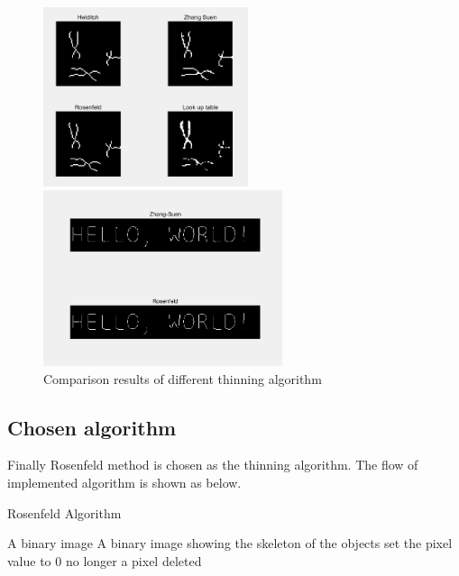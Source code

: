 \documentclass[hyperref]{article}
\theoremstyle{nonumberplain}
\begin{document}
	\begin{figure}[h]
		\centering
		\begin{minipage}[t]{0.48\textwidth}
			\centering
			\includegraphics[width=6cm]{result.png}
		\end{minipage}
		\begin{minipage}[t]{0.48\textwidth}
			\centering
			\includegraphics[width=7cm]{thinning result Q2.png}
		\end{minipage}
		\caption{Comparison results of different thinning algorithm}
		\label{fig14}
	\end{figure}
	
	\subsection{Chosen algorithm}
	
	\hspace{1.0em}
	Finally Rosenfeld method is chosen as the thinning algorithm. The flow of implemented algorithm is shown as below.

	\begin{algorithm}
		\renewcommand{\algorithmicrequire}{\textbf{Input:}}
		\renewcommand{\algorithmicensure}{\textbf{Output:}}
		\caption{Rosenfeld Algorithm}
		\label{alg2}
		\begin{algorithmic}[1]
			\REQUIRE A binary image
			\ENSURE A binary image showing the skeleton of the objects
			\REPEAT
			\STATE set the pixel value to 0
			\ENDIF 
			\ENDIF
			\ENDIF
			\UNTIL no longer a pixel deleted
		\end{algorithmic}  
	\end{algorithm}
	
\end{document}
